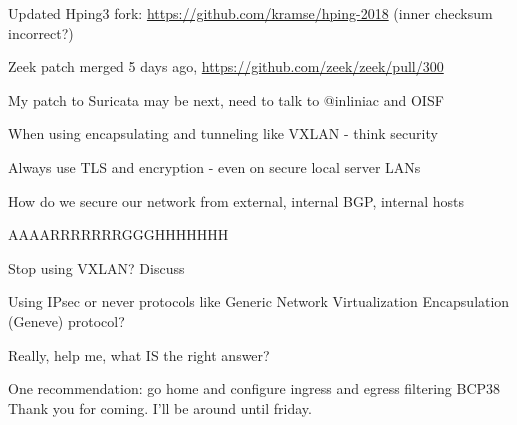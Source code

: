 \documentclass[Screen16to9,17pt]{foils}
\begin{document}
\vskip 1cm
\begin{list2}
\item Updated Hping3 fork: \url{https://github.com/kramse/hping-2018} (inner checksum incorrect?)
\item Zeek patch merged 5 days ago, \url{https://github.com/zeek/zeek/pull/300}
\item My patch to Suricata may be next, need to talk to @inliniac and OISF
\end{list2}



\begin{list2}
\item When using encapsulating and tunneling like VXLAN - think security
\item Always use TLS and encryption - even on secure local server LANs
\item How do we secure our network from external, internal BGP, internal hosts
\item AAAARRRRRRRGGGHHHHHHH \smiley
\item Stop using VXLAN? Discuss
\item Using IPsec or never protocols like Generic Network Virtualization Encapsulation\\
(Geneve) protocol?{\small {}}
\end{list2}
\vskip 1cm
Really, help me, what IS the right answer? \smiley

\vskip 1cm

One recommendation: go home and configure ingress and egress filtering BCP38
\vskip 1cm
Thank you for coming. I'll be around until friday.
\end{document}
